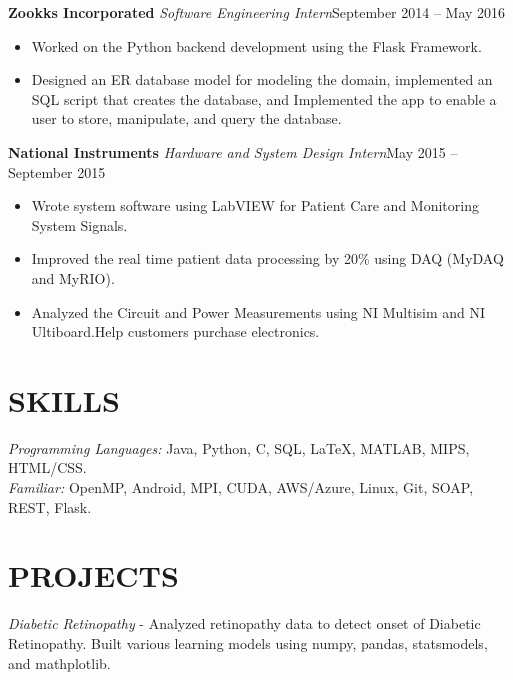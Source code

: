 \documentclass[11pt]{res}
\begin{document}
\begin{resume}
{\bfseries \large Zookks Incorporated} \newline 
 {\sl Software Engineering Intern}\hfill  September 2014 – May 2016\\
  \vspace{-2mm}
 \begin{itemize}
 \item Worked on the Python backend development using the Flask Framework.
 \item Designed an ER database model for modeling the domain, implemented an SQL script that creates the
database, and Implemented the app to enable a user to store, manipulate, and query the database.
 \end{itemize}
  \vspace{-2mm}
 
{\bfseries \large National Instruments} \newline 
 {\sl Hardware and System Design Intern}\hfill May 2015 – September 2015\\
 \vspace{-2mm}
 \begin{itemize}
 \item Wrote system software using LabVIEW for Patient Care and Monitoring System Signals.
 \item Improved the real time patient data processing by 20\% using DAQ (MyDAQ and MyRIO).
 \item Analyzed the Circuit and Power Measurements using NI Multisim and NI Ultiboard.Help customers purchase electronics.
 \end{itemize}
  \vspace{-2mm}
 
\section{\Large {}\selectfont SKILLS}
{\sl Programming Languages:}   Java, Python, C, SQL, \LaTeX, MATLAB, MIPS, HTML/CSS. \\
{\sl Familiar:} OpenMP, Android, MPI, CUDA, AWS/Azure, Linux, Git, SOAP, REST, Flask.
 \vspace{-2mm}

\section{\Large {}\selectfont PROJECTS}
{\itshape \large Diabetic Retinopathy} - Analyzed retinopathy data to detect onset of Diabetic Retinopathy. Built various learning models using numpy, pandas, statsmodels, and mathplotlib.


\end{resume}
\end{document}
